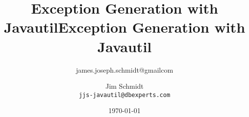 \documentclass[a4paper,10pt]{book}
\title{Exception Generation with Javautil}
\author{james.joseph.schmidt@gmailcom}
\begin{document}
\title{Exception Generation with Javautil}
\author{Jim Schmidt\\
  \texttt{jjs-javautil@dbexperts.com}}
\date{\today}
\maketitle
\tableofcontents

\end{document}
